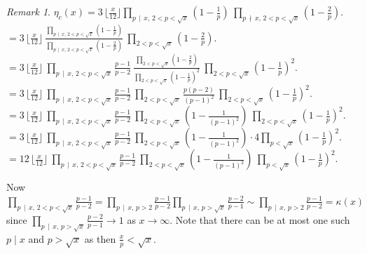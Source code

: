 \documentclass[11pt]{article}
\theoremstyle{definition}
\theoremstyle{remark}
\newtheorem{remark}[theorem]{Remark}
\numberwithin{equation}{section}
\newcommand{\Div}[2]{#1\,\mid\, #2}
\newcommand{\nDiv}[2]{#1\,\nmid\, #2}
\begin{document}
\begin{remark}
\vspace{1em}
\noindent
$\displaystyle{\eta_c(x) = 3\, \lfloor\frac{x}{12}\rfloor \prod\limits_{\Div{p}{x},\, 2<p<\sqrt{x}} \left( 1-\frac{1}{p}\right)\ \prod\limits_{\nDiv{p}{x},\, 2<p< \sqrt{x}} \left( 1-\frac{2}{p}\right).}$\\[1em]
$\displaystyle{= 3\, \lfloor\frac{x}{12}\rfloor \ \frac{\prod\limits_{\Div{p}{x},\, 2<p<\sqrt{x}} \left( 1-\frac{1}{p}\right)}{\prod\limits_{\Div{p}{x},\, 2<p< \sqrt{x}} \left( 1-\frac{2}{p}\right)} \ \prod\limits_{2<p< \sqrt{x}} \left( 1-\frac{2}{p}\right).}$\\[1em]
$\displaystyle{ = 3\, \lfloor\frac{x}{12}\rfloor \ \prod\limits_{\Div{p}{x},\, 2<p<\sqrt{x}} \frac{p-1}{p-2}\  \frac{\prod\limits_{2<p< \sqrt{x}} \left( 1-\frac{2}{p}\right)}{\prod\limits_{2<p< \sqrt{x}} \left( 1-\frac{1}{p}\right)^2} \ \prod\limits_{2<p< \sqrt{x}} \left( 1-\frac{1}{p}\right)^2.}$\\[1em]
$\displaystyle{ = 3\, \lfloor\frac{x}{12}\rfloor \ \prod\limits_{\Div{p}{x},\, 2<p<\sqrt{x}} \frac{p-1}{p-2} \ \prod\limits_{2<p< \sqrt{x}} \frac{p(p-2)}{(p-1)^2}\  \prod\limits_{2<p< \sqrt{x}} \left( 1-\frac{1}{p}\right)^2.}$\\[1em]
$\displaystyle{ = 3\, \lfloor\frac{x}{12}\rfloor \ \prod\limits_{\Div{p}{x},\, 2<p<\sqrt{x}} \frac{p-1}{p-2} \ \prod\limits_{2<p< \sqrt{x}} \left( 1-\frac{1}{(p-1)^2}\right) \ \prod\limits_{2<p< \sqrt{x}} \left( 1-\frac{1}{p}\right)^2.}$\\[1em]
$\displaystyle{ = 3\, \lfloor\frac{x}{12}\rfloor \ \prod\limits_{\Div{p}{x},\, 2<p<\sqrt{x}} \frac{p-1}{p-2} \ \prod\limits_{2<p< \sqrt{x}} \left( 1-\frac{1}{(p-1)^2}\right) \cdot 4\prod\limits_{p< \sqrt{x}} \left( 1-\frac{1}{p}\right)^2.}$\\[1em]
$\displaystyle{ = 12\, \lfloor\frac{x}{12}\rfloor \ \prod\limits_{\Div{p}{x},\, 2<p<\sqrt{x}} \frac{p-1}{p-2}\  \prod\limits_{2<p< \sqrt{x}} \left( 1-\frac{1}{(p-1)^2}\right) \ \prod\limits_{p< \sqrt{x}} \left( 1-\frac{1}{p}\right)^2.}$

\vspace{1em}
\noindent
Now $\prod\limits_{\Div{p}{x},\, 2<p<\sqrt{x}} \frac{p-1}{p-2} = \prod\limits_{\Div{p}{x},\, p>2} \frac{p-1}{p-2} \prod\limits_{\Div{p}{x},\, p>\sqrt{x}} \frac{p-2}{p-1}\sim \prod\limits_{\Div{p}{x},\, p>2} \frac{p-1}{p-2}=\kappa(x)$\\[1em] 
since $\prod\limits_{\Div{p}{x},\, p>\sqrt{x}} \frac{p-2}{p-1}\rightarrow 1$ as $x\rightarrow\infty$. Note that there can be at most one such $p\mid x$ and $p>\sqrt{x}$ as then $\frac{x}{p}<\sqrt{x}$.


\end{remark}
\end{document}
